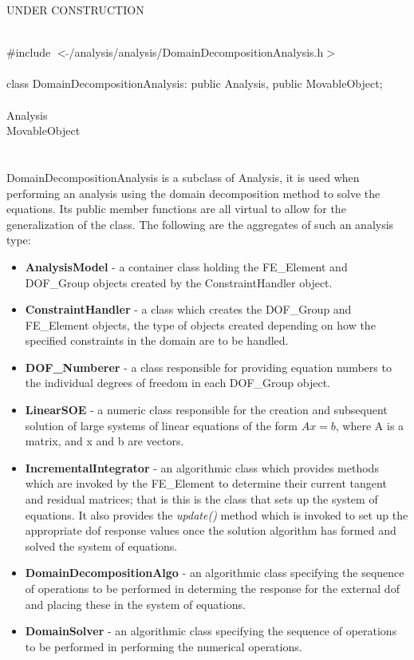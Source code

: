 
UNDER CONSTRUCTION

   \\
\indent \#include $<\tilde{
}$/analysis/analysis/DomainDecompositionAnalysis.h$>$  \\ 

  \\
\indent class DomainDecompositionAnalysis: public Analysis, public MovableObject;  \\

 \\
\indent Analysis \\
\indent MovableObject \\
\indent{} \\

 \\ 
\indent DomainDecompositionAnalysis is a subclass of Analysis, 
it is used when performing an analysis using the domain decomposition
method to solve the equations. Its public member functions are all
virtual to allow for the generalization of the 
class. The following are the aggregates of such an analysis type:
\begin{itemize}
\item {\bf AnalysisModel} - a container class holding the FE\_Element
and DOF\_Group objects created by the ConstraintHandler object. 
\item {\bf ConstraintHandler} - a class which creates the DOF\_Group
and FE\_Element objects, the type of objects created depending on how
the specified constraints in the domain are to be handled. 
\item {\bf DOF\_Numberer} - a class responsible for providing equation
numbers to the individual degrees of freedom in each DOF\_Group object.
\item {\bf LinearSOE} - a numeric class responsible for the creation
and subsequent solution of large systems of linear equations of the
form $Ax = b$, where A is a matrix, and x and b are vectors.
\item {\bf IncrementalIntegrator} - an algorithmic class which provides
methods which are invoked by the FE\_Element to determine their
current tangent and residual matrices; that is this is the class that
sets up the system of equations.  It also provides the {\em
update()} method which is invoked to set up the appropriate dof
response values once the solution algorithm has formed and solved the
system of equations.
\item {\bf DomainDecompositionAlgo} - an algorithmic class specifying the
sequence of operations to be performed in determing the response
for the external dof and placing these in the system of equations.
\item {\bf DomainSolver} - an algorithmic class specifying the
sequence of operations to be performed in performing the numerical 
operations.
\end{itemize}


